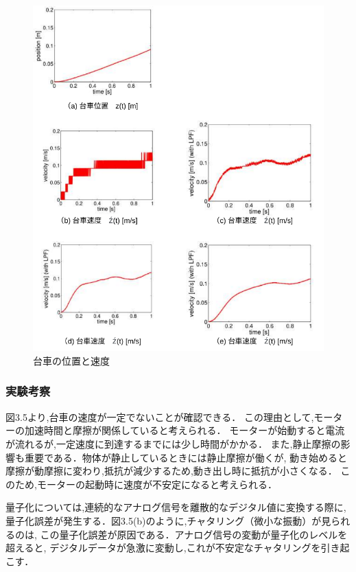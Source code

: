 \begin{figure}[h]
  \centering
  \includegraphics[scale=1]{sozai/3.pdf}
  \caption{台車の位置と速度}
\end{figure}

\newpage

\subsubsection{実験考察}
図3.5より,台車の速度が一定でないことが確認できる．
この理由として,モーターの加速時間と摩擦が関係していると考えられる．
モーターが始動すると電流が流れるが,一定速度に到達するまでには少し時間がかかる．
また,静止摩擦の影響も重要である．物体が静止しているときには静止摩擦が働くが,
動き始めると摩擦が動摩擦に変わり,抵抗が減少するため,動き出し時に抵抗が小さくなる．
このため,モーターの起動時に速度が不安定になると考えられる．

量子化については,連続的なアナログ信号を離散的なデジタル値に変換する際に,
量子化誤差が発生する．図3.5(b)のように,チャタリング（微小な振動）が見られるのは,
この量子化誤差が原因である．アナログ信号の変動が量子化のレベルを超えると,
デジタルデータが急激に変動し,これが不安定なチャタリングを引き起こす．

